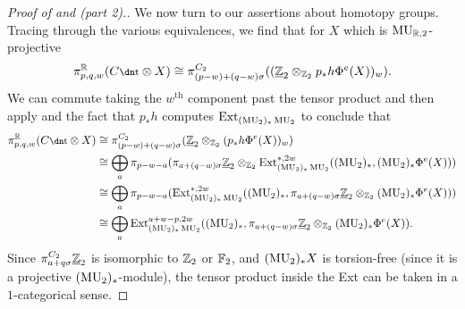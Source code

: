 \begin{proof}[Proof of  and  (part 2).]
  We now turn to our assertions about homotopy groups.
  Tracing through the various equivalences, we find that for $X$ which is $\operatorname{\mathrm{MU}}_{\mathbb{R},2}$-projective
  \[ \pi_{p,q,w}^\R(C\ta \otimes X) \cong \pi_{(p-w) + (q-w)\sigma}^{C_2} ( (\uZt \otimes_{\Zt} p_*h \Phi^e (X))_w ). \]
  We can commute taking the $w^{\mathrm{th}}$ component past the tensor product and then apply  and the fact that $p_*h$ computes $\operatorname{\mathrm{Ext}}_{(\operatorname{\mathrm{MU}}_2)_*\operatorname{\mathrm{MU}}_2}$ to conclude that
  \begin{align*}
    \pi_{p,q,w}^\R(C\ta \otimes X)
    &\cong \pi_{(p-w) + (q-w)\sigma}^{C_2} (\uZt \otimes_{\Zt} (p_*h \Phi^e (X))_w ) \\
    &\cong \bigoplus_a \pi_{p-w-a} (\pi_{a+(q-w)\sigma}\uZt \otimes_{\Zt} \Ext_{(\MU_2)_*\MU_2}^{*,2w}((\MU_2)_*, (\MU_2)_* \Phi^e (X) )) \\
    &\cong \bigoplus_a \pi_{p-w-a} (\Ext_{(\MU_2)_*\MU_2}^{*,2w}((\MU_2)_*, \pi_{a+(q-w)\sigma}\uZt \otimes_{\Zt} (\MU_2)_* \Phi^e (X) )) \\
    &\cong \bigoplus_a \Ext_{(\MU_2)_*\MU_2}^{a+w-p,2w}((\MU_2)_*, \pi_{a+(q-w)\sigma}\uZt \otimes_{\Zt} (\MU_2)_* \Phi^e (X) ). 
  \end{align*}
  Since $\pi_{a+q\sigma} ^{C_2} \underline{\mathbb{Z}}_{2}$ is isomorphic to $\mathbb{Z}_2$ or $\operatorname{\mathbb{F}}_2$, and $(\operatorname{\mathrm{MU}}_2)_* X$ is torsion-free (since it is a projective $(\operatorname{\mathrm{MU}}_2)_*$-module), the tensor product inside the Ext can be taken in a $1$-categorical sense.

\end{proof}
